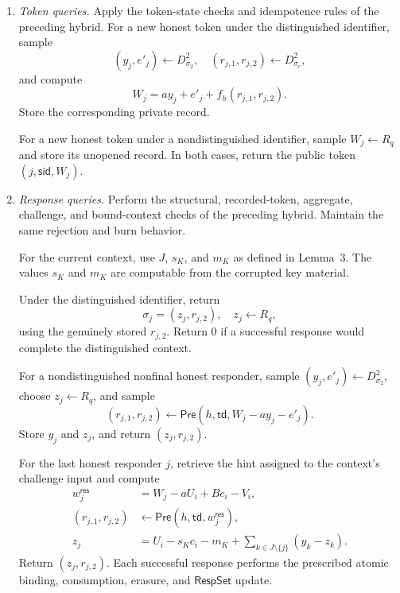 \documentclass[lettersize,journal]{IEEEtran}
\begin{document}
\begin{enumerate}
		\item \emph{Token queries.}
		Apply the token-state checks and idempotence rules
		of the preceding hybrid.
		For a new honest token under the distinguished identifier,
		sample
		\[
		(y_j,e'_j)\leftarrow D_{\sigma_2}^{2},
		\quad
		(r_{j,1},r_{j,2})\leftarrow D_{\sigma_r}^{2},
		\]
		and compute
		\[
		W_j=ay_j+e'_j+f_h(r_{j,1},r_{j,2}).
		\]
		Store the corresponding private record.
		
		For a new honest token under a nondistinguished identifier,
		sample $W_j\leftarrow R_q$ and store its unopened record.
		In both cases, return the public token
		$(j,\mathsf{sid},W_j)$.
		
		\item \emph{Response queries.}
		Perform the structural, recorded-token, aggregate,
		challenge, and bound-context checks of the preceding hybrid.
		Maintain the same rejection and burn behavior.
		
		For the current context, use $J$, $s_K$, and $m_K$
		as defined in Lemma~3.
		The values $s_K$ and $m_K$ are computable from the
		corrupted key material.
		
		Under the distinguished identifier, return
		\[
		\sigma_j=(z_j,r_{j,2}),
		\quad z_j\leftarrow R_q,
		\]
		using the genuinely stored $r_{j,2}$.
		Return $0$ if a successful response would complete
		the distinguished context.
		
		For a nondistinguished nonfinal honest responder,
		sample $(y_j,e'_j)\leftarrow D_{\sigma_2}^{2}$,
		choose $z_j\leftarrow R_q$, and sample
		\[
		(r_{j,1},r_{j,2})\leftarrow
		\mathsf{Pre}(h,\mathsf{td},W_j-ay_j-e'_j).
		\]
		Store $y_j$ and $z_j$, and return $(z_j,r_{j,2})$.
		
		For the last honest responder $j$, retrieve the hint
		assigned to the context's challenge input and compute
		\begin{equation}
			\begin{aligned}
				w_j^{\mathsf{res}}
				&=W_j-aU_i+Bc_i-V_i,\\
				(r_{j,1},r_{j,2})
				&\leftarrow
				\mathsf{Pre}(h,\mathsf{td},w_j^{\mathsf{res}}),\\
				z_j
				&=U_i-s_Kc_i-m_K
				+\sum_{k\in J\setminus\{j\}}(y_k-z_k).
			\end{aligned}
			\label{eq:app-talon-hint-simulation}
		\end{equation}
		Return $(z_j,r_{j,2})$.
		Each successful response performs the prescribed atomic
		binding, consumption, erasure, and $\mathsf{RespSet}$ update.
		

\end{enumerate}
\end{document}
